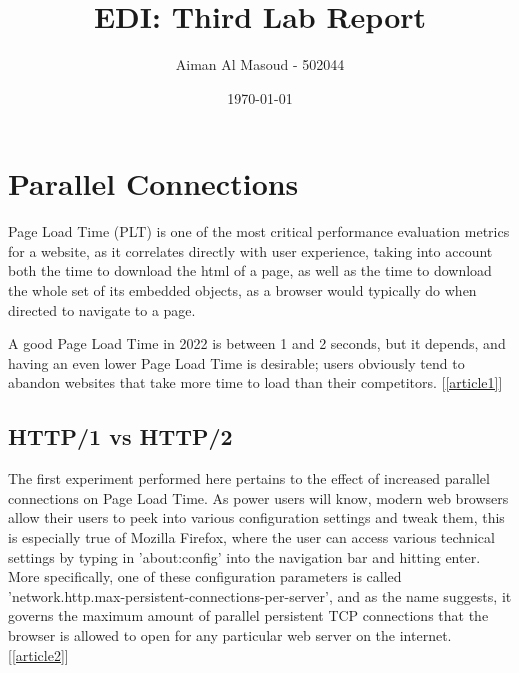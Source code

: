 \documentclass[a4paper,10pt]{article}
\begin{document}
\title{EDI: Third Lab Report}
\author{Aiman Al Masoud - 502044}
\date{\today}

\maketitle

\begin{abstract}
\end{abstract}

\clearpage
\clearpage
\clearpage
\clearpage
\clearpage
\clearpage

\setcounter{page}{1}

\section{Parallel Connections}
% 

Page Load Time (PLT) is one of the most critical performance evaluation metrics for a website, as it correlates directly with user experience, taking into account both the time to download the html of a page, as well as the time to download the whole set of its embedded objects, as a browser would typically do when directed to navigate to a page.

A good Page Load Time in 2022 is between 1 and 2 seconds, but it depends, and having an even lower Page Load Time is desirable; users obviously tend to abandon websites that take more time to load than their competitors. [\ref{article1}] 


\subsection{HTTP/1 vs HTTP/2}

The first experiment performed here pertains to the effect of increased parallel connections on Page Load Time. As power users will know, modern web browsers allow their users to peek into various configuration settings and tweak them, this is especially true of Mozilla Firefox, where the user can access various technical settings by typing in 'about:config' into the navigation bar and hitting enter. More specifically, one of these configuration parameters is called 'network.http.max-persistent-connections-per-server', and as the name suggests, it governs the maximum amount of parallel persistent TCP connections that the browser is allowed to open for any particular web server on the internet. [\ref{article2}] 
\end{document}
